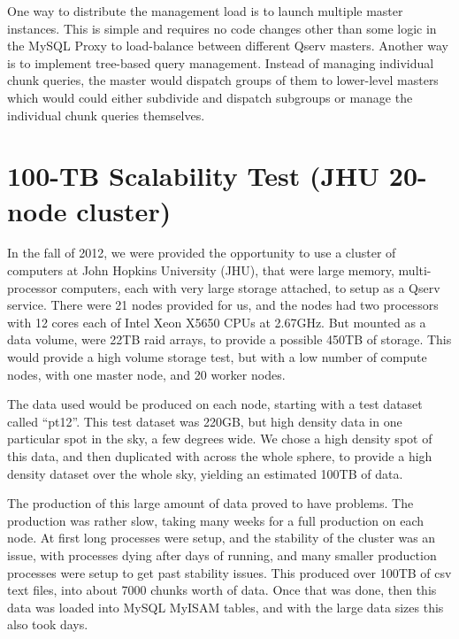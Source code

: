 \documentclass[DM,toc]{lsstdoc}
\begin{document}
One way to distribute the management load is to launch multiple master
instances. This is simple and requires no code changes other than some
logic in the MySQL Proxy to load-balance between different Qserv
masters. Another way is to implement tree-based query management.
Instead of managing individual chunk queries, the master would dispatch
groups of them to lower-level masters which would could either subdivide
and dispatch subgroups or manage the individual chunk queries
themselves.

\section{100-TB Scalability Test (JHU 20-node
cluster)}\label{tb-scalability-test-jhu-20-node-cluster}

In the fall of 2012, we were provided the opportunity to use a cluster
of computers at John Hopkins University (JHU), that were large memory,
multi-processor computers, each with very large storage attached, to
setup as a Qserv service. There were 21 nodes provided for us, and the
nodes had two processors with 12 cores each of Intel Xeon X5650 CPUs at
2.67GHz. But mounted as a data volume, were 22TB raid arrays, to provide
a possible 450TB of storage. This would provide a high volume storage
test, but with a low number of compute nodes, with one master node, and
20 worker nodes.

The data used would be produced on each node, starting with a test
dataset called ``pt12''. This test dataset was 220GB, but high density
data in one particular spot in the sky, a few degrees wide. We chose a
high density spot of this data, and then duplicated with across the
whole sphere, to provide a high density dataset over the whole sky,
yielding an estimated 100TB of data.

The production of this large amount of data proved to have problems. The
production was rather slow, taking many weeks for a full production on
each node. At first long processes were setup, and the stability of the
cluster was an issue, with processes dying after days of running, and
many smaller production processes were setup to get past stability
issues. This produced over 100TB of csv text files, into about 7000
chunks worth of data. Once that was done, then this data was loaded into
MySQL MyISAM tables, and with the large data sizes this also took days.
\end{document}
